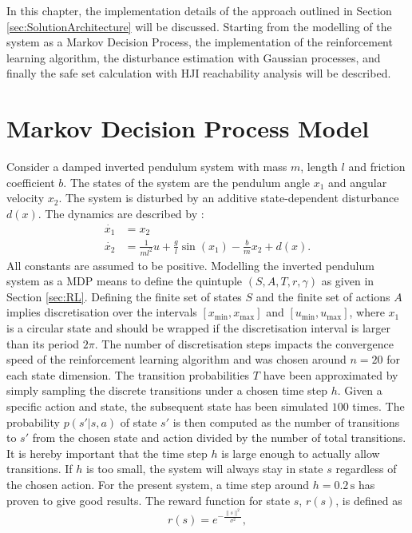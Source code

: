 \documentclass[../main.tex]{subfiles}
\begin{document}
In this chapter, the implementation details of the approach outlined in Section \ref{sec:SolutionArchitecture} will be discussed. Starting from the modelling of the system as a Markov Decision Process, the implementation of the reinforcement learning algorithm, the disturbance estimation with Gaussian processes, and finally the safe set calculation with HJI reachability analysis will be described.
\section{Markov Decision Process Model}\label{sec:implementation_MDP}
Consider a damped inverted pendulum system with mass $m$, length $l$ and friction coefficient $b$. The states of the system are the pendulum angle $x_1$ and angular velocity $x_2$. The system is disturbed by an additive state-dependent disturbance $d(x)$. The dynamics are described by \cite{doya2000reinforcement}:
\begin{align}
    \dot{x_1} &= x_2\\
    \dot{x_2} &= \frac{1}{ml^2}u+\frac{g}{l}\sin(x_1)-\frac{b}{m}x_2+d(x).
\end{align}
All constants are assumed to be positive. 
Modelling the inverted pendulum system as a MDP means to define the quintuple $(S,A,T,r,\gamma)$ as given in Section \ref{sec:RL}. Defining the finite set of states $S$ and the finite set of actions $A$ implies discretisation over the intervals $[x_{\min}, x_{\max}]$ and $[u_{\min}, u_{\max}]$, where $x_1$ is a circular state and should be wrapped if the discretisation interval is larger than its period $2\pi$. The number of discretisation  steps impacts the convergence speed of the reinforcement learning algorithm and was chosen around $n = 20$ for each state dimension.
The transition probabilities $T$ have been approximated by simply sampling the discrete transitions under a chosen time step $h$. Given a specific action and state, the subsequent state has been simulated $100$ times. The probability $p(s'|s,a)$ of state $s'$ is then computed as the number of transitions to $s'$ from the chosen state and action divided by the number of total transitions. It is hereby important that the time step $h$ is large enough to actually allow transitions. If $h$ is too small, the system will always stay in state $s$ regardless of the chosen action. For the present system, a time step around $h = 0.2\,\text{s}$ has proven to give good results. The reward function for state $s$, $r(s)$, is defined as
\begin{equation}
    r(s) = e^{-\frac{\|s\|^2}{\sigma^2}},
\end{equation}
\end{document}

